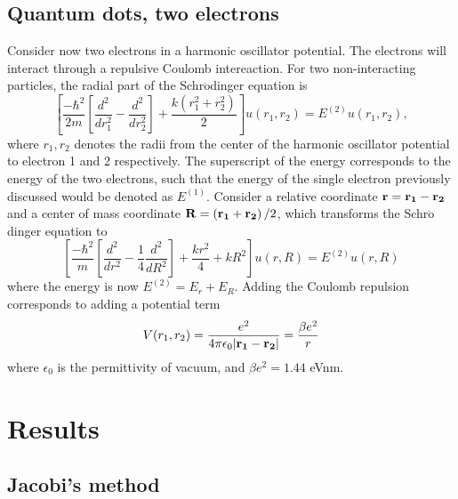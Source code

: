 \documentclass{emulateapj}
\begin{document}
\subsection{Quantum dots, two electrons}
Consider now two electrons in a harmonic oscillator potential. The electrons will interact through a repulsive Coulomb intereaction. For two non-interacting particles, the radial part of the Schr$\ddot{\mathrm{o}}$dinger equation is
%
\begin{equation*}
    \left[\frac{-\hbar^2}{2m}\left[\frac{d^2}{dr_1^2} - \frac{d^2}{dr_2^2}\right] + \frac{k\left(r_1^2 + r_2^2\right)}{2}\right]u(r_1,r_2) = E^{(2)}u(r_1,r_2),
\end{equation*}
%
where $r_1, r_2$ denotes the radii from the center of the harmonic oscillator potential to electron 1 and 2 respectively. The superscript of the energy corresponds to the energy of the two electrons, such that the energy of the single electron previously discussed would be denoted as $E^{(1)}$. Consider a relative coordinate $\bold{r} = \bold{r_1} - \bold{r_2}$ and a center of mass coordinate $\bold{R} = \left(\bold{r_1} + \bold{r_2}\right)/2$, which transforms the Schr$\ddot{\mathrm{o}}$dinger equation to
%
\begin{equation*}
    \left[\frac{-\hbar^2}{m}\left[\frac{d^2}{dr^2} - \frac{1}{4}\frac{d^2}{dR^2}\right] + \frac{kr^2}{4} + kR^2\right]u(r,R) = E^{(2)}u(r,R)
\end{equation*}
%
where the energy is now $E^{(2)} = E_r + E_R$.  Adding the Coulomb repulsion corresponds to adding a potential term
%
\begin{equation*}
    V(r_1,r_2) = \frac{e^2}{4\pi \epsilon_0 |\bold{r_1} - \bold{r_2}|} = \frac{\beta e^2}{r}
\end{equation*}
%
where $\epsilon_0$ is the permittivity of vacuum, and $\beta e^2 = 1.44$ eVnm.


\section{Results}
\label{sec:results}

\subsection{Jacobi's method}
\end{document}
